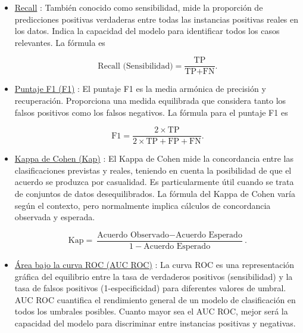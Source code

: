 \documentclass[10pt, oneside, a4paper]{article}
\begin{document}
\begin{itemize}
		
		\item \href{https://scikit-learn.org/stable/modules/generated/sklearn.metrics.recall_score.html}{Recall} \cite{muller2022guideline}: También conocido como sensibilidad, mide la proporción de predicciones positivas verdaderas entre todas las instancias positivas reales en los datos. Indica la capacidad del modelo para identificar todos los casos relevantes. La fórmula es
		
		\begin{equation}\label{eq:recall}
			\text{Recall (Sensibilidad)} = \frac{\text{TP}}{\text{TP} + \text{FN}}.
		\end{equation}
		
		
		\item \href{https://scikit-learn.org/stable/modules/generated/sklearn.metrics.f1_score.html}{Puntaje F1 (F1)} \cite{muller2022guideline}: El puntaje F1 es la media armónica de precisión y recuperación. Proporciona una medida equilibrada que considera tanto los falsos positivos como los falsos negativos. La fórmula para el puntaje F1 es
		
		\begin{equation}\label{eq:f1}
			\text{F1} = \frac{2 \times \text{TP}}{2 \times \text{TP} + \text{FP} + \text{FN}}.
		\end{equation}
		
		
		\item \href{https://scikit-learn.org/stable/modules/generated/sklearn.metrics.cohen_kappa_score.html}{Kappa de Cohen (Kap)} \cite{muller2022guideline}: El Kappa de Cohen mide la concordancia entre las clasificaciones previstas y reales, teniendo en cuenta la posibilidad de que el acuerdo se produzca por casualidad. Es particularmente útil cuando se trata de conjuntos de datos desequilibrados. La fórmula del Kappa de Cohen varía según el contexto, pero normalmente implica cálculos de concordancia observada y esperada.
		
		\begin{equation}\label{eq:cohen_kappa}
			\text{Kap} = \frac{\text{Acuerdo Observado} - \text{Acuerdo Esperado}}{1 - \text{Acuerdo Esperado}}.
		\end{equation}
		
		
		\item \href{https://scikit-learn.org/stable/modules/generated/sklearn.metrics.roc_auc_score.html}{Área bajo la curva ROC (AUC ROC)} \cite{muller2022guideline}: La curva ROC es una representación gráfica del equilibrio entre la tasa de verdaderos positivos (sensibilidad) y la tasa de falsos positivos (1-especificidad) para diferentes valores de umbral. AUC ROC cuantifica el rendimiento general de un modelo de clasificación en todos los umbrales posibles. Cuanto mayor sea el AUC ROC, mejor será la capacidad del modelo para discriminar entre instancias positivas y negativas.


\end{itemize}
\end{document}
